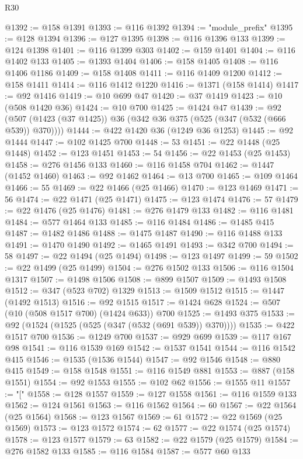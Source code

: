 \begin{lexlean}{R30}
\begin{coremodule}
@1392 := @158 @1391
@1393 := @116 @1392
@1394 := "module_prefix"
@1395 := @128 @1394
@1396 := @127 @1395
@1398 := @116 @1396 @133
@1399 := @124 @1398
@1401 := @116 @1399 @303
@1402 := @159 @1401
@1404 := @116 @1402 @133
@1405 := @1393 @1404
@1406 := @158 @1405
@1408 := @116 @1406 @1186
@1409 := @158 @1408
@1411 := @116 @1409 @1200
@1412 := @158 @1411
@1414 := @116 @1412 @1220
@1416 := @1371 (@158 @1414)
@1417 := @92 @1416
@1419 := @10 @699 @47
@1420 := @37 @1419
@1423 := @10 (@508 @1420 @36)
@1424 := @10 @700
@1425 := @1424 @47
@1439 := @92 (@507 (@1423 (@37 @1425)) @36 (@342 @36 @375 (@525 (@347 (@532 (@666 @539)) @370))))
@1444 := @422 @1420 @36 (@1249 @36 @1253)
@1445 := @92 @1444
@1447 := @102 @1425 @700
@1448 := 53
@1451 := @22 @1448 (@25 @1448)
@1452 := @123 @1451
@1453 := 54
@1456 := @22 @1453 (@25 @1453)
@1458 := @276 @1456 @133
@1460 := @116 @1458 @704
@1462 := @1447 (@1452 @1460)
@1463 := @92 @1462
@1464 := @13 @700
@1465 := @109 @1464
@1466 := 55
@1469 := @22 @1466 (@25 @1466)
@1470 := @123 @1469
@1471 := 56
@1474 := @22 @1471 (@25 @1471)
@1475 := @123 @1474
@1476 := 57
@1479 := @22 @1476 (@25 @1476)
@1481 := @276 @1479 @133
@1482 := @116 @1481
@1484 := @577 @1464 @133
@1485 := @116 @1484
@1486 := @1485 @415
@1487 := @1482 @1486
@1488 := @1475 @1487
@1490 := @116 @1488 @133
@1491 := @1470 @1490
@1492 := @1465 @1491
@1493 := @342 @700
@1494 := 58
@1497 := @22 @1494 (@25 @1494)
@1498 := @123 @1497
@1499 := 59
@1502 := @22 @1499 (@25 @1499)
@1504 := @276 @1502 @133
@1506 := @116 @1504 @1317
@1507 := @1498 @1506
@1508 := @899 @1507
@1509 := @1493 @1508
@1512 := @347 (@523 @702) @1329
@1513 := @1509 @1512
@1515 := @1447 (@1492 @1513)
@1516 := @92 @1515
@1517 := @1424 @628
@1524 := @507 (@10 (@508 @1517 @700) (@1424 @633)) @700
@1525 := @1493 @375
@1533 := @92 (@1524 (@1525 (@525 (@347 (@532 (@691 @539)) @370))))
@1535 := @422 @1517 @700
@1536 := @1249 @700
@1537 := @929 @699
@1539 := @117 @167 @98
@1541 := @116 @1539 @169
@1542 := @1537 @1541
@1544 := @116 @1542 @415
@1546 := @1535 (@1536 @1544)
@1547 := @92 @1546
@1548 := @880 @415
@1549 := @158 @1548
@1551 := @116 @1549 @881
@1553 := @887 (@158 @1551)
@1554 := @92 @1553
@1555 := @102 @62
@1556 := @1555 @11
@1557 := "["
@1558 := @128 @1557
@1559 := @127 @1558
@1561 := @116 @1559 @133
@1562 := @124 @1561
@1563 := @116 @1562
@1564 := 60
@1567 := @22 @1564 (@25 @1564)
@1568 := @123 @1567
@1569 := 61
@1572 := @22 @1569 (@25 @1569)
@1573 := @123 @1572
@1574 := 62
@1577 := @22 @1574 (@25 @1574)
@1578 := @123 @1577
@1579 := 63
@1582 := @22 @1579 (@25 @1579)
@1584 := @276 @1582 @133
@1585 := @116 @1584
@1587 := @577 @60 @133

\end{coremodule}
\end{lexlean}
